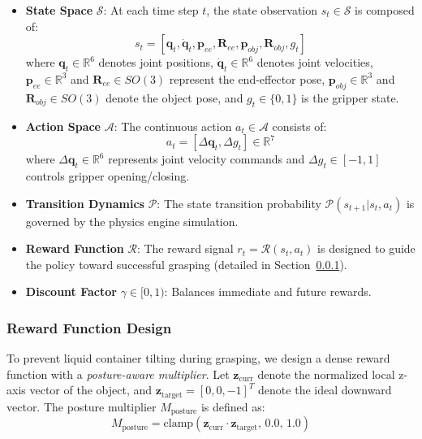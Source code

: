 \begin{itemize}
    \item \textbf{State Space} $\mathcal{S}$: At each time step $t$, the state observation $s_t \in \mathcal{S}$ is composed of:
    \begin{equation}
        s_t = [\mathbf{q}_t, \dot{\mathbf{q}}_t, \mathbf{p}_{ee}, \mathbf{R}_{ee}, \mathbf{p}_{obj}, \mathbf{R}_{obj}, g_t]
    \end{equation}
    where $\mathbf{q}_t \in \mathbb{R}^6$ denotes joint positions, $\dot{\mathbf{q}}_t \in \mathbb{R}^6$ denotes joint velocities, $\mathbf{p}_{ee} \in \mathbb{R}^3$ and $\mathbf{R}_{ee} \in SO(3)$ represent the end-effector pose, $\mathbf{p}_{obj} \in \mathbb{R}^3$ and $\mathbf{R}_{obj} \in SO(3)$ denote the object pose, and $g_t \in \{0, 1\}$ is the gripper state.

    \item \textbf{Action Space} $\mathcal{A}$: The continuous action $a_t \in \mathcal{A}$ consists of:
    \begin{equation}
        a_t = [\Delta\mathbf{q}_t, \Delta g_t] \in \mathbb{R}^7
    \end{equation}
    where $\Delta\mathbf{q}_t \in \mathbb{R}^6$ represents joint velocity commands and $\Delta g_t \in [-1, 1]$ controls gripper opening/closing.

    \item \textbf{Transition Dynamics} $\mathcal{P}$: The state transition probability $\mathcal{P}(s_{t+1}|s_t, a_t)$ is governed by the physics engine simulation.

    \item \textbf{Reward Function} $\mathcal{R}$: The reward signal $r_t = \mathcal{R}(s_t, a_t)$ is designed to guide the policy toward successful grasping (detailed in Section~\ref{subsec:reward_design}).

    \item \textbf{Discount Factor} $\gamma \in [0, 1)$: Balances immediate and future rewards.
\end{itemize}


\subsubsection{Reward Function Design}
\label{subsec:reward_design}

To prevent liquid container tilting during grasping, we design a dense reward function with a \textit{posture-aware multiplier}. Let $\mathbf{z}_{\text{curr}}$ denote the normalized local z-axis vector of the object, and $\mathbf{z}_{\text{target}} = [0, 0, -1]^T$ denote the ideal downward vector. The posture multiplier $M_{\text{posture}}$ is defined as:
\begin{equation}
    M_{\text{posture}} = \text{clamp}(\mathbf{z}_{\text{curr}} \cdot \mathbf{z}_{\text{target}}, \, 0.0, \, 1.0)
\end{equation}

